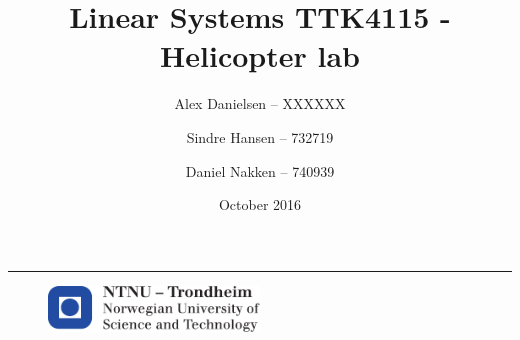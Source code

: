 \documentclass{article}
\title{Linear Systems TTK4115 - Helicopter lab}
\author{
  Alex Danielsen -- XXXXXX \and
  Sindre Hansen -- 732719 \and
  Daniel Nakken -- 740939}
\date{October 2016}
\begin{document}
\begin{titlepage}
    \maketitle
    \rule{\linewidth}{0.5mm}
    \begin{figure}
    \centering
    \includegraphics[width=0.5\textwidth]{images/logontnu_eng}
    \end{figure}
    \thispagestyle{empty}
\end{titlepage}

\tableofcontents
\thispagestyle{empty} %
\newpage
\setcounter{page}{1}


\end{document}
